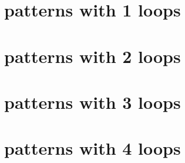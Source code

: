 \section{patterns with 1 loops}




















\section{patterns with 2 loops}






















\section{patterns with 3 loops}




\section{patterns with 4 loops}


